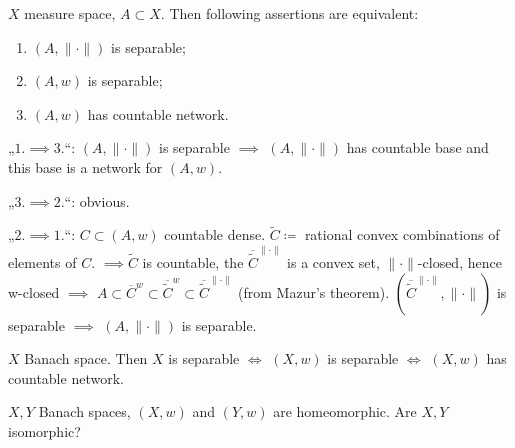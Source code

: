 \documentclass[12pt]{article}					%
\begin{document}
\begin{veta}
	$X$ measure space, $A \subset X$. Then following assertions are equivalent:
	\begin{enumerate}
		\item $(A, \|·\|)$ is separable;
		\item $(A, w)$ is separable;
		\item $(A, w)$ has countable network.
	\end{enumerate}

	\begin{dukazin}
		„$1. \implies 3.$“: $(A, \|·\|)$ is separable $\implies$ $(A, \|·\|)$ has countable base and this base is a network for $(A, w)$.

		„$3. \implies 2.$“: obvious.

		„$2. \implies 1.$“: $C \subset (A, w)$ countable dense. $\tilde C \coloneq$ rational convex combinations of elements of $C$. $\implies \tilde C$ is countable, the $\overline{\tilde C}^{\|·\|}$ is a convex set, $\|·\|$-closed, hence w-closed $\implies$ $A \subset \overline{C}^w \subset \overline{\tilde C}^w \subset \overline{\tilde C}^{\|·\|}$ (from Mazur's theorem). $(\overline{\tilde C}^{\|·\|}, \|·\|)$ is separable $\implies$ $(A, \|·\|)$ is separable.
	\end{dukazin}
\end{veta}

\begin{dusledek}
	$X$ Banach space. Then $X$ is separable $\Leftrightarrow$ $(X, w)$ is separable $\Leftrightarrow$ $(X, w)$ has countable network.

	\begin{prikladin}
		$X, Y$ Banach spaces, $(X, w)$ and $(Y, w)$ are homeomorphic. Are $X, Y$ isomorphic?
	\end{prikladin}
\end{dusledek}
\end{document}
